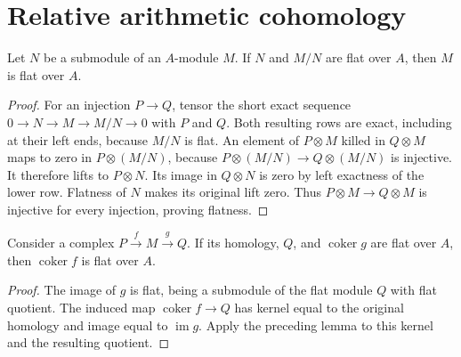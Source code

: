 \chapter{Relative arithmetic cohomology}

\begin{lemma}
\label{lem:relative-flat-extension}
\leanok
Let $N$ be a submodule of an $A$-module $M$. If $N$ and $M/N$ are flat over $A$,
then $M$ is flat over $A$.
\end{lemma}
\begin{proof}
For an injection $P\to Q$, tensor the short exact sequence
$0\to N\to M\to M/N\to0$ with $P$ and $Q$. Both resulting rows are exact,
including at their left ends, because $M/N$ is flat. An element of
$P\otimes M$ killed in $Q\otimes M$ maps to zero in $P\otimes(M/N)$,
because $P\otimes(M/N)\to Q\otimes(M/N)$ is injective. It therefore lifts
to $P\otimes N$. Its image in $Q\otimes N$ is zero by left exactness of
the lower row. Flatness of $N$ makes its original lift zero. Thus
$P\otimes M\to Q\otimes M$ is injective for every injection, proving flatness.
\end{proof}

\begin{lemma}
\label{lem:relative-flat-opcycles}
\leanok
Consider a complex $P\xrightarrow f M\xrightarrow g Q$. If its homology,
$Q$, and $\operatorname{coker}g$ are flat over $A$, then
$\operatorname{coker}f$ is flat over $A$.
\end{lemma}
\begin{proof}
The image of $g$ is flat, being a submodule of the flat module $Q$ with
flat quotient. The induced map $\operatorname{coker}f\to Q$ has kernel
equal to the original homology and image equal to $\operatorname{im}g$.
Apply the preceding lemma to this kernel and the resulting quotient.
\end{proof}

